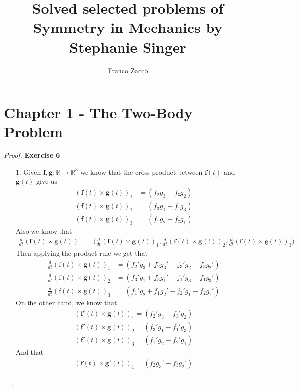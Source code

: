 \documentclass[11pt]{article}
\title{\textbf{Solved selected problems of Symmetry in Mechanics by Stephanie Singer}}
\author{Franco Zacco}
\date{}
\newcommand{\R}{\mathbb{R}}
\theoremstyle{definition}
\begin{document}
\maketitle
\thispagestyle{empty}

\section*{Chapter 1 - The Two-Body Problem}

\begin{proof}{\textbf{Exercise 6}}
\begin{itemize}
    \item [1.] Given $\bm{f},\bm{g}:\R \to \R^3$ we know that the cross product
    between $\bm{f}(t)$ and $\bm{g}(t)$ give us
    \begin{align*}
        (\bm{f}(t) \times \bm{g}(t))_1 &= (f_2g_3 - f_3g_2)\\
        (\bm{f}(t) \times \bm{g}(t))_2 &= (f_3g_1 - f_1g_3)\\
        (\bm{f}(t) \times \bm{g}(t))_3 &= (f_1g_2 - f_2g_1)
    \end{align*}
    Also we know that 
    \begin{align*}
        \frac{d}{dt}(\bm{f}(t) \times \bm{g}(t))
        &= \bigg(
            \frac{d}{dt}(\bm{f}(t) \times \bm{g}(t))_1,
            \frac{d}{dt}(\bm{f}(t) \times \bm{g}(t))_2,
            \frac{d}{dt}(\bm{f}(t) \times \bm{g}(t))_3
        \bigg)
    \end{align*}
    Then applying the product rule we get that
    \begin{align*}
        \frac{d}{dt}(\bm{f}(t) \times \bm{g}(t))_1 &= 
        (f_2'g_3 + f_2g_3' - f_3'g_2 - f_3g_2')\\
        \frac{d}{dt}(\bm{f}(t) \times \bm{g}(t))_2 &= 
        (f_3'g_1 + f_3g_1' - f_1'g_3 - f_1g_3')\\
        \frac{d}{dt}(\bm{f}(t) \times \bm{g}(t))_3 &= 
        (f_1'g_2 + f_1g_2' - f_2'g_1 - f_2g_1')
    \end{align*}
    On the other hand, we know that
    \begin{align*}
        (\bm{f}'(t)\times \bm{g}(t))_1 = (f_2'g_3 - f_3'g_2)\\
        (\bm{f}'(t)\times \bm{g}(t))_2 = (f_3'g_1 - f_1'g_3)\\
        (\bm{f}'(t)\times \bm{g}(t))_3 = (f_1'g_2 - f_2'g_1)
    \end{align*}
    And that
    \begin{align*}
        (\bm{f}(t)\times \bm{g}'(t))_1 = (f_2g_3' - f_3g_2')\\

\end{align*}
\end{itemize}
\end{proof}
\end{document}
